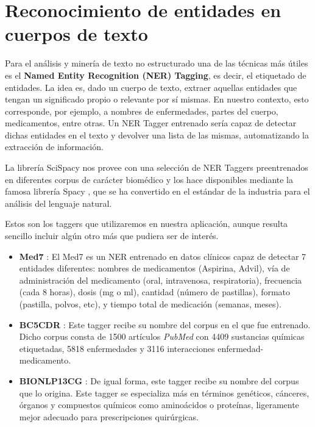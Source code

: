 \section{Reconocimiento de entidades en \\cuerpos de texto}
\label{sec:nertagger}
Para el análisis y minería de texto no estructurado una de las técnicas más útiles es el \textbf{Named Entity Recognition (NER) Tagging}, es decir, el etiquetado de entidades. La idea es, dado un cuerpo de texto, extraer aquellas entidades que tengan un significado propio o relevante por sí mismas. En nuestro contexto, esto corresponde, por ejemplo, a nombres de enfermedades, partes del cuerpo, medicamentos, entre otras. Un NER Tagger entrenado sería capaz de detectar dichas entidades en el texto y devolver una lista de las mismas, automatizando la extracción de información.

La librería SciSpacy \cite{neumann-etal-2019-scispacy} nos provee con una selección de NER Taggers preentrenados en diferentes corpus de carácter biomédico y los hace disponibles mediante la famosa librería Spacy \cite{spacy}, que se ha convertido en el estándar de la industria para el análisis del lenguaje natural.

Estos son los taggers que utilizaremos en nuestra aplicación, aunque resulta sencillo incluir algún otro más que pudiera ser de interés.

\begin{itemize}
	\item \textbf{Med7} \cite{med7}: El Med7 es un NER entrenado en datos clínicos capaz de detectar 7 entidades diferentes: nombres de medicamentos (Aspirina, Advil), vía de administración del medicamento (oral, intravenosa, respiratoria), frecuencia (cada 8 horas), dosis (mg o ml), cantidad (número de pastillas), formato (pastilla, polvos, etc), y tiempo total de medicación (semanas, meses). 
	\item \textbf{BC5CDR} \cite{bc5cdr}: Este tagger recibe su nombre del corpus en el que fue entrenado. Dicho corpus consta de 1500 artículos \textit{PubMed} con 4409 sustancias químicas etiquetadas, 5818 enfermedades y 3116 interacciones enfermedad-medicamento.
	\item \textbf{BIONLP13CG} \cite{BIONLP13CG}: De igual forma, este tagger recibe su nombre del corpus que lo origina. Este tagger se especializa más en términos genéticos, cánceres, órganos y compuestos químicos como aminoácidos o proteínas, ligeramente mejor adecuado para prescripciones quirúrgicas.
\end{itemize}

